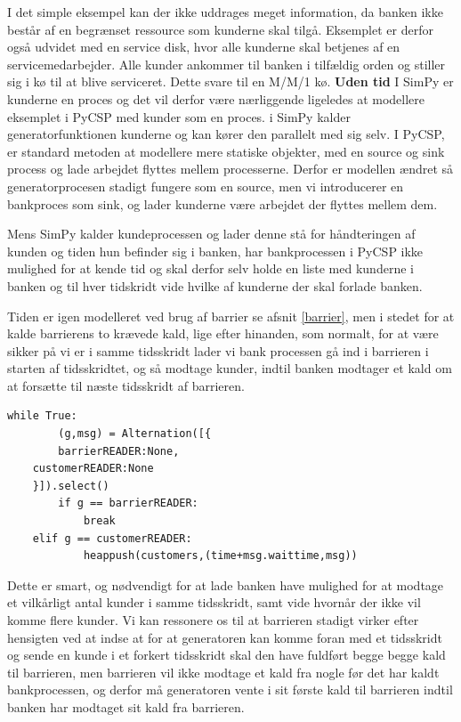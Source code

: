 I det simple eksempel kan der ikke uddrages meget information, da banken ikke 
består af en begrænset ressource som kunderne skal tilgå.  Eksemplet er derfor 
også udvidet med en service disk, hvor alle kunderne skal betjenes af en 
servicemedarbejder. Alle kunder ankommer til banken i tilfældig orden og 
stiller sig i kø til at blive serviceret. Dette  svare til en M/M/1 kø.
\textbf{Uden tid}
I SimPy er kunderne en proces og det vil derfor være nærliggende ligeledes at 
modellere eksemplet i PyCSP med kunder som en proces. i SimPy kalder 
generatorfunktionen kunderne og kan kører den parallelt med sig selv. 
I PyCSP, er standard metoden at modellere mere statiske objekter, med en source og sink 
process og lade arbejdet flyttes mellem processerne. Derfor er modellen ændret 
så  generatorprocesen stadigt fungere som en source, men vi introducerer en 
bankproces som sink, og lader kunderne være arbejdet der flyttes mellem dem. 

Mens SimPy  kalder kundeprocessen og lader denne stå for håndteringen af 
kunden og tiden hun befinder sig i banken, har bankprocessen i PyCSP ikke 
mulighed for at kende tid og skal derfor selv holde en liste med kunderne 
i banken og  til hver tidskridt vide hvilke af kunderne der skal forlade 
banken. 

Tiden er igen modelleret ved brug af barrier se afsnit \vref{barrier}, men 
i stedet for  at kalde barrierens to krævede kald, lige efter hinanden, som 
normalt, for at være sikker på vi er i samme tidsskridt lader vi bank
processen gå ind i barrieren i starten af tidsskridtet, og så modtage kunder, 
indtil banken modtager et kald om at forsætte til næste tidsskridt af 
barrieren.
\begin{lstlisting}[float,label=bank-alternation-imp,caption=Modtage en kunde eller 
	barrier i Bankprocessen]
while True:
		(g,msg) = Alternation([{
		barrierREADER:None,
    customerREADER:None
    }]).select()
		if g == barrierREADER:
			break
    elif g == customerREADER:
			heappush(customers,(time+msg.waittime,msg))
\end{lstlisting}
Dette er smart, og nødvendigt for at lade banken have mulighed for at modtage 
et vilkårligt antal kunder i samme tidsskridt, samt vide hvornår der ikke vil  
komme flere kunder. Vi kan ressonere os til at barrieren stadigt virker efter 
hensigten ved at indse at for at generatoren kan komme foran med et tidsskridt og sende en 
kunde i et forkert tidsskridt skal den have fuldført begge begge kald til barrieren, men 
barrieren vil ikke modtage et kald fra nogle før det har kaldt bankprocessen, 
og derfor må generatoren vente i sit første kald til barrieren indtil banken har 
modtaget sit kald fra barrieren. 

